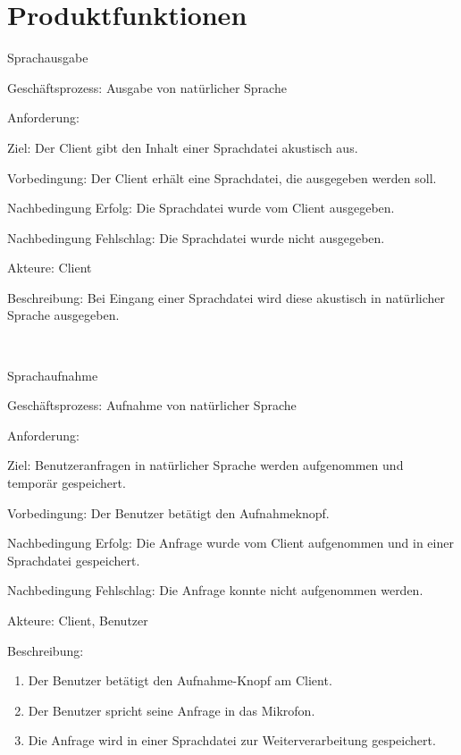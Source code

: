 

\chapter{Produktfunktionen}\label{test1}

\begin{function}{10}{Sprachausgabe}
\item[Geschäftsprozess:] Ausgabe von natürlicher Sprache
\item[Anforderung:] 
\item[Ziel:] Der Client gibt den Inhalt einer Sprachdatei akustisch aus.
\item[Vorbedingung:] Der Client erhält eine Sprachdatei, die ausgegeben werden soll.
\item[Nachbedingung Erfolg:] Die Sprachdatei wurde vom Client ausgegeben.
\item[Nachbedingung Fehlschlag:] Die Sprachdatei wurde nicht ausgegeben.
\item[Akteure:] Client
\item[Beschreibung:] Bei Eingang einer Sprachdatei wird diese akustisch in natürlicher Sprache ausgegeben.
\end{function} ~

\begin{function}{11}{Sprachaufnahme}
\item[Geschäftsprozess:] Aufnahme von natürlicher Sprache
\item[Anforderung:] 
\item[Ziel:] Benutzeranfragen in natürlicher Sprache werden aufgenommen und temporär gespeichert.
\item[Vorbedingung:] Der Benutzer betätigt den Aufnahmeknopf.
\item[Nachbedingung Erfolg:] Die Anfrage wurde vom Client aufgenommen und in einer Sprachdatei gespeichert.
\item[Nachbedingung Fehlschlag:] Die Anfrage konnte nicht aufgenommen werden.
\item[Akteure:] Client, Benutzer
\item[Beschreibung:] ~
\begin{enumerate}
\item Der Benutzer betätigt den Aufnahme-Knopf am Client.
\item Der Benutzer spricht seine Anfrage in das Mikrofon.
\item Die Anfrage wird in einer Sprachdatei zur Weiterverarbeitung gespeichert.
\end{enumerate}
\end{function} ~

